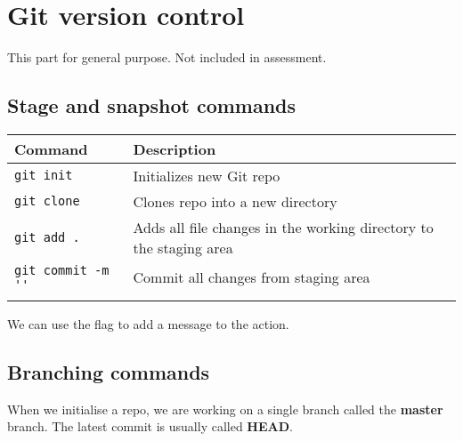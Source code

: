 \documentclass{article}
\begin{document}
\section{Git version control}
This part for general purpose. Not included in assessment.
\subsection{Stage and snapshot commands}
\begin{table}[H]
    \begin{tabular}{ll}
        \textbf{Command}             & \textbf{Description}                                               \\ \hline
        \lstinline|git init|         & Initializes new Git repo                                           \\ \arrayrulecolor{lightgray}\hline
        \lstinline|git clone|        & Clones repo into a new directory                                   \\ \arrayrulecolor{lightgray}\hline
        \lstinline|git add . |       & Adds all file changes in the working directory to the staging area \\ \arrayrulecolor{lightgray}\hline
        \lstinline|git commit -m ''| & Commit all changes from staging area                               \\ \arrayrulecolor{lightgray}\hline
    \end{tabular}
\end{table}
We can use the  flag to add a message to the action.
\subsection{Branching commands}
When we initialise a repo, we are working on a single branch called the \textbf{master} branch. The latest commit is usually called \textbf{HEAD}.
\end{document}

